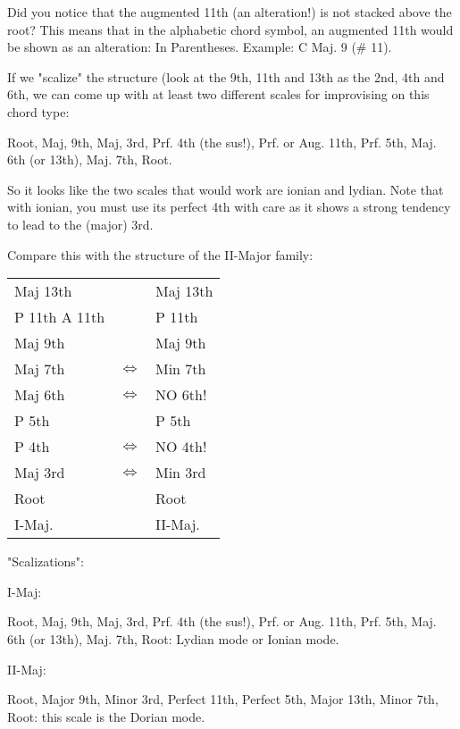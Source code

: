 Did you notice that the augmented 11th (an alteration!) is not stacked 
above the root? This means that in the alphabetic chord symbol, an 
augmented 11th would be shown as an alteration: In Parentheses. Example:
C Maj. 9 (\# 11).

If we "scalize" the structure (look at the 9th, 11th and 13th as the 2nd, 
4th and 6th, we can come up with at least two different scales for 
improvising on this chord type:

Root, Maj, 9th, Maj, 3rd, Prf. 4th (the sus!), Prf. or Aug. 11th, 
Prf. 5th, Maj. 6th (or 13th), Maj. 7th, Root.

So it looks like the two scales that would work are ionian and lydian. 
Note that with ionian, you must use its perfect 4th with care as it shows 
a strong tendency to lead to the (major) 3rd.

Compare this with the structure of the II-Major family:

\begin{tabular}{ | l c l | }
	\hline
	Maj 13th					&					& Maj 13th				\\
	P 11th   A 11th   & 				& P 11th					\\
	Maj 9th           & 				& Maj 9th					\\
	Maj 7th    				& $\iff$	& Min 7th					\\
	Maj 6th						& $\iff$	& NO 6th!					\\
	P 5th             & 				& P 5th						\\
	P 4th							& $\iff$	& NO 4th!					\\
	Maj 3rd						& $\iff$	& Min 3rd					\\
	Root              & 				& Root						\\
	\hline
  I-Maj.            & 				& II-Maj.					\\
  \hline
\end{tabular}

"Scalizations":

I-Maj:

Root, Maj, 9th, Maj, 3rd, Prf. 4th (the sus!), Prf. or Aug. 11th, 
Prf. 5th, Maj. 6th (or 13th), Maj. 7th, Root: Lydian mode or Ionian mode.

II-Maj:

Root, Major 9th, Minor 3rd, Perfect 11th, Perfect 5th, 
Major 13th, Minor 7th, Root: this scale is the Dorian mode.

